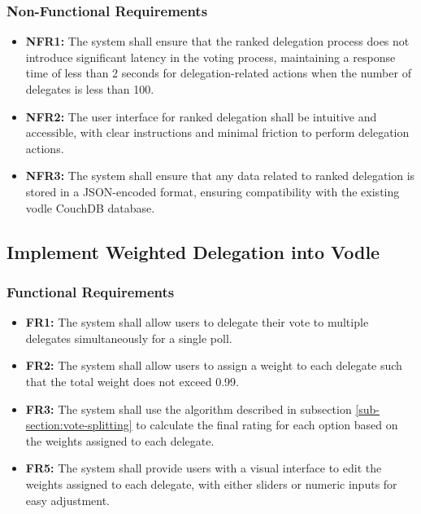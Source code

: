\subsubsection{Non-Functional Requirements}
\begin{itemize}
    \item \textbf{NFR1:} The system shall ensure that the ranked delegation process does not introduce significant latency in the voting process, maintaining a response time of less than 2 seconds for delegation-related actions when the number of delegates is less than 100.

    \item \textbf{NFR2:} The user interface for ranked delegation shall be intuitive and accessible, with clear instructions and minimal friction to perform delegation actions.
    
    \item \textbf{NFR3:} The system shall ensure that any data related to ranked delegation is stored in a JSON-encoded format, ensuring compatibility with the existing vodle CouchDB database.
\end{itemize}
\subsection{Implement Weighted Delegation into Vodle}
\subsubsection{Functional Requirements}
\begin{itemize}
    \item \textbf{FR1:} The system shall allow users to delegate their vote to multiple delegates simultaneously for a single poll.

    \item \textbf{FR2:} The system shall allow users to assign a weight to each delegate such that the total weight does not exceed 0.99.

    \item \textbf{FR3:} The system shall use the algorithm described in subsection \ref{sub-section:vote-splitting} to calculate the final rating for each option based on the weights assigned to each delegate.

    \item \textbf{FR5:} The system shall provide users with a visual interface to edit the weights assigned to each delegate, with either sliders or numeric inputs for easy adjustment.
\end{itemize}


